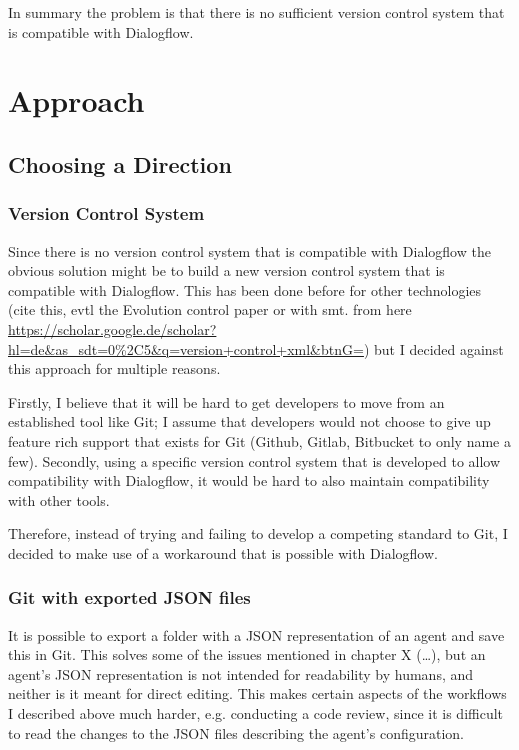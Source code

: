 In summary the problem is that there is no sufficient version control system that is compatible with Dialogflow.

\chapter{Approach}

\section{Choosing a Direction}

\subsection{Version Control System}

Since there is no version control system that is compatible with Dialogflow the obvious solution might be to build a new version control system that is compatible with Dialogflow. This has been done before for other technologies (cite this, evtl the Evolution control paper or with smt. from here \citeNeeded \url{https://scholar.google.de/scholar?hl=de&as_sdt=0%2C5&q=version+control+xml&btnG=}) but I decided against this approach for multiple reasons.

Firstly, I believe that it will be hard to get developers to move from an established tool like Git; I assume that developers would not choose to give up feature rich support that exists for Git (Github, Gitlab, Bitbucket to only name a few).
Secondly, using a specific version control system that is developed to allow compatibility with Dialogflow, it would be hard to also maintain compatibility with other tools.

Therefore, instead of trying and failing to develop a competing standard to Git, I decided to make use of a workaround that is possible with Dialogflow.

\subsection{Git with exported JSON files}

It is possible to export a folder with a JSON representation of an agent and save this in Git. This solves some of the issues mentioned in chapter X (…), but an agent's JSON representation is not intended for readability by humans, and neither is it meant for direct editing. This makes certain aspects of the workflows I described above much harder, e.g. conducting a code review, since it is difficult to read the changes to the JSON files describing the agent’s configuration.

